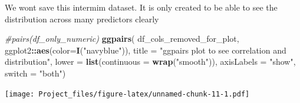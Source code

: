 \documentclass[
]{article}
\newenvironment{Shaded}{\begin{snugshade}}{\end{snugshade}}
\newcommand{\CommentTok}[1]{\textcolor[rgb]{0.56,0.35,0.01}{\textit{#1}}}
\newcommand{\ControlFlowTok}[1]{\textcolor[rgb]{0.13,0.29,0.53}{\textbf{#1}}}
\newcommand{\DataTypeTok}[1]{\textcolor[rgb]{0.13,0.29,0.53}{#1}}
\newcommand{\DecValTok}[1]{\textcolor[rgb]{0.00,0.00,0.81}{#1}}
\newcommand{\KeywordTok}[1]{\textcolor[rgb]{0.13,0.29,0.53}{\textbf{#1}}}
\newcommand{\NormalTok}[1]{#1}
\newcommand{\OperatorTok}[1]{\textcolor[rgb]{0.81,0.36,0.00}{\textbf{#1}}}
\newcommand{\StringTok}[1]{\textcolor[rgb]{0.31,0.60,0.02}{#1}}
\begin{document}
We wont save this intermim dataset. It is only created to be able to see the distribution across many predictors clearly

\begin{Shaded}
\end{Shaded}

\begin{Shaded}
\begin{Highlighting}[]
\CommentTok{#pairs(df_only_numeric)}
\KeywordTok{ggpairs}\NormalTok{( df_cols_removed_for_plot, ggplot2}\OperatorTok{::}\KeywordTok{aes}\NormalTok{(}\DataTypeTok{color=}\KeywordTok{I}\NormalTok{(}\StringTok{"navyblue"}\NormalTok{)), }\DataTypeTok{title =} \StringTok{"ggpairs plot to see correlation and distribution"}\NormalTok{, }\DataTypeTok{lower =} \KeywordTok{list}\NormalTok{(}\DataTypeTok{continuous =} \KeywordTok{wrap}\NormalTok{(}\StringTok{"smooth"}\NormalTok{)), }\DataTypeTok{axisLabels =} \StringTok{"show"}\NormalTok{, }\DataTypeTok{switch =} \StringTok{"both"}\NormalTok{)}
\end{Highlighting}
\end{Shaded}

\texttt{[image: Project\_files/figure-latex/unnamed-chunk-11-1.pdf]}
\end{document}
